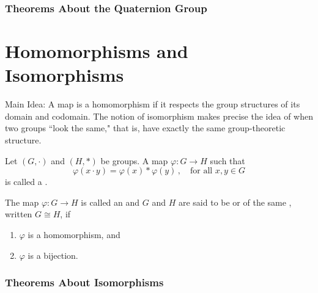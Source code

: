 \subsubsection{Theorems About the Quaternion Group}


\newpage

\section{Homomorphisms and Isomorphisms}

Main Idea: A map is a homomorphism if it respects the group 
structures of its domain and codomain. The notion of isomorphism 
makes precise the idea of when two groups ``look the same," that 
is, have exactly the same group-theoretic structure.

\begin{definition}[Homomorphism]
	Let $(G, \cdot)$ and $(H, *)$ be groups. A map $\varphi:G \to 
	H$ 
	such that 
	\[
		\varphi(x \cdot y) = \varphi(x) * \varphi(y)\,, \quad 
		\text{for all } x,y \in G
	\]
	is called a .
\end{definition}

\begin{definition}[Isomorphism]
	The map $\varphi:G \to H$ is called an  and $G$ 
	and $H$ are said to be  or of the same 
	, written $G \cong H$, if 
	\begin{enumerate}
		\item $\varphi$ is a homomorphism, and
		\item $\varphi$ is a bijection.
	\end{enumerate}
\end{definition}

\subsubsection{Theorems About Isomorphisms}

